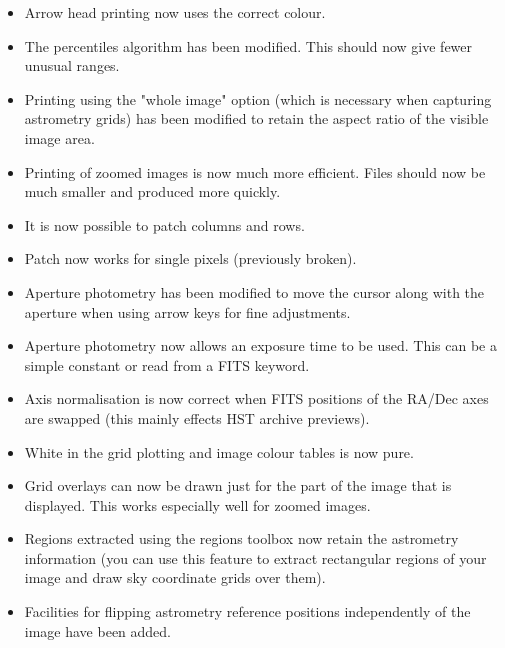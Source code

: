 \documentclass[twoside,11pt]{article}
\renewcommand{\_}{\texttt{\symbol{95}}}
\begin{document}
\begin{itemize}
    \item Arrow head printing now uses the correct colour.

    \item The percentiles algorithm has been modified. This should now
      give fewer unusual ranges.

    \item Printing using the "whole image" option (which is necessary
      when capturing astrometry grids) has been modified to retain
      the aspect ratio of the visible image area.

    \item Printing of zoomed images is now much more efficient. Files
      should now be much smaller and produced more quickly.

    \item It is now possible to patch columns and rows.

    \item Patch now works for single pixels (previously broken).

    \item Aperture photometry has been modified to move the cursor along
      with the aperture when using arrow keys for fine adjustments.

    \item Aperture photometry now allows an exposure time to be used. This
      can be a simple constant or read from a FITS keyword.

    \item Axis normalisation is now correct when FITS positions of the
      RA/Dec axes are swapped (this mainly effects HST archive previews).

    \item White in the grid plotting and image colour tables is now pure.

    \item Grid overlays can now be drawn just for the part of the image
      that is displayed. This works especially well for zoomed images.

    \item Regions extracted using the regions toolbox now retain the
      astrometry information (you can use this feature to extract
      rectangular regions of your image and draw sky coordinate grids
      over them).

    \item Facilities for flipping astrometry reference positions
      independently of the image have been added.


\end{itemize}
\end{document}
